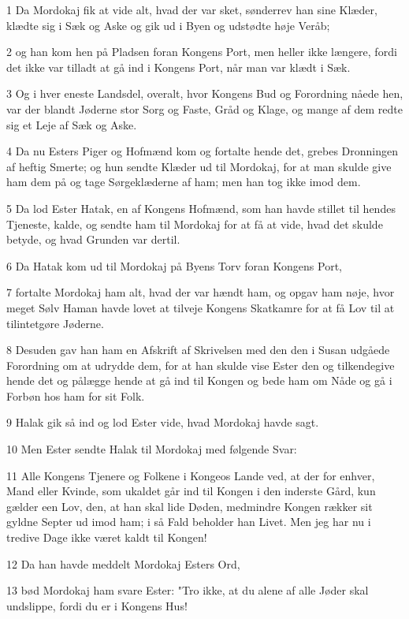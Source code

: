 \par 1 Da Mordokaj fik at vide alt, hvad der var sket, sønderrev han sine Klæder, klædte sig i Sæk og Aske og gik ud i Byen og udstødte høje Veråb;
\par 2 og han kom hen på Pladsen foran Kongens Port, men heller ikke længere, fordi det ikke var tilladt at gå ind i Kongens Port, når man var klædt i Sæk.
\par 3 Og i hver eneste Landsdel, overalt, hvor Kongens Bud og Forordning nåede hen, var der blandt Jøderne stor Sorg og Faste, Gråd og Klage, og mange af dem redte sig et Leje af Sæk og Aske.
\par 4 Da nu Esters Piger og Hofmænd kom og fortalte hende det, grebes Dronningen af heftig Smerte; og hun sendte Klæder ud til Mordokaj, for at man skulde give ham dem på og tage Sørgeklæderne af ham; men han tog ikke imod dem.
\par 5 Da lod Ester Hatak, en af Kongens Hofmænd, som han havde stillet til hendes Tjeneste, kalde, og sendte ham til Mordokaj for at få at vide, hvad det skulde betyde, og hvad Grunden var dertil.
\par 6 Da Hatak kom ud til Mordokaj på Byens Torv foran Kongens Port,
\par 7 fortalte Mordokaj ham alt, hvad der var hændt ham, og opgav ham nøje, hvor meget Sølv Haman havde lovet at tilveje Kongens Skatkamre for at få Lov til at tilintetgøre Jøderne.
\par 8 Desuden gav han ham en Afskrift af Skrivelsen med den den i Susan udgåede Forordning om at udrydde dem, for at han skulde vise Ester den og tilkendegive hende det og pålægge hende at gå ind til Kongen og bede ham om Nåde og gå i Forbøn hos ham for sit Folk.
\par 9 Halak gik så ind og lod Ester vide, hvad Mordokaj havde sagt.
\par 10 Men Ester sendte Halak til Mordokaj med følgende Svar:
\par 11 Alle Kongens Tjenere og Folkene i Kongeos Lande ved, at der for enhver, Mand eller Kvinde, som ukaldet går ind til Kongen i den inderste Gård, kun gælder een Lov, den, at han skal lide Døden, medmindre Kongen rækker sit gyldne Septer ud imod ham; i så Fald beholder han Livet. Men jeg har nu i tredive Dage ikke været kaldt til Kongen!
\par 12 Da han havde meddelt Mordokaj Esters Ord,
\par 13 bød Mordokaj ham svare Ester: "Tro ikke, at du alene af alle Jøder skal undslippe, fordi du er i Kongens Hus!

